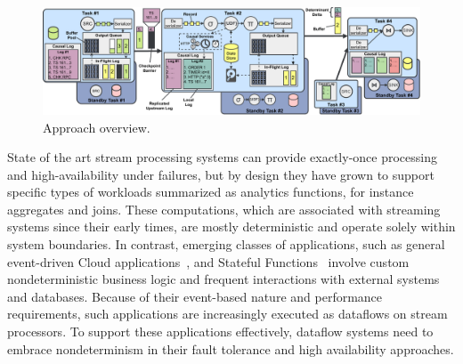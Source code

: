 \documentclass[sigconf]{acmart}
\begin{document}
\begin{figure}[!t]
  \centering
  \includegraphics[width=.98\textwidth]{Figures/normal-op.pdf}
  \vspace{-2mm}
  \caption{Approach overview.} %
  \label{fig:operation}
  \vspace{-2mm}
\end{figure}


State of the art stream processing systems can provide exactly-once processing and high-availability under failures, but by design they have grown to support specific types of workloads summarized as analytics functions, for instance aggregates and joins.
These computations, which are associated with streaming systems since their early times, are mostly deterministic and operate solely within system boundaries.
In contrast, emerging classes of applications, such as general event-driven Cloud applications~\cite{Katsifodimos2019Operational, Carbone2020beyond}, and Stateful Functions~\cite{akhter2019stateful, cloudburst} involve custom nondeterministic business logic and frequent interactions with external systems and databases.
Because of their event-based nature and performance requirements, such applications are increasingly executed as dataflows on stream processors.
To support these applications effectively, dataflow systems need to embrace nondeterminism in their fault tolerance and high availability approaches.
\end{document}
